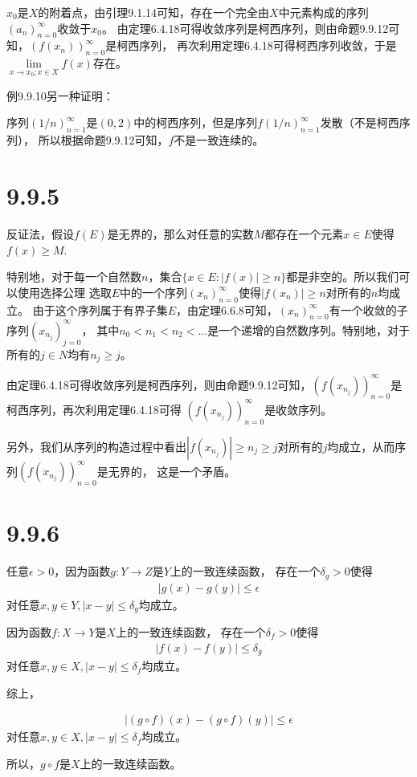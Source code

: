 \documentclass{article}
\begin{document}
$x_0$是$X$的附着点，由引理9.1.14可知，存在一个完全由$X$中元素构成的序列$(a_n)_{n=0}^\infty$收敛于$x_0$。
由定理6.4.18可得收敛序列是柯西序列，则由命题9.9.12可知，$(f(x_n))_{n=0}^\infty$是柯西序列，
再次利用定理6.4.18可得柯西序列收敛，于是
$\lim\limits_{x \to x_0; x \in X} f(x)$存在。

例9.9.10另一种证明：

序列$(1/n)_{n=1}^\infty$是$(0,2)$中的柯西序列，但是序列$f(1/n)_{n=1}^\infty$发散（不是柯西序列），
所以根据命题9.9.12可知，$f$不是一致连续的。

\section*{9.9.5}

反证法，假设$f(E)$是无界的，那么对任意的实数$M$都存在一个元素$x \in E$使得$f(x) \geq M$.

特别地，对于每一个自然数$n$，集合$\{x \in E: |f(x)| \geq n\}$都是非空的。所以我们可以使用选择公理
选取$E$中的一个序列$(x_n)_{n=0}^\infty$使得$|f(x_n)| \geq n$对所有的$n$均成立。
由于这个序列属于有界子集$E$，由定理6.6.8可知，$(x_n)_{n=0}^\infty$有一个收敛的子序列$(x_{n_j})_{j=0}^\infty$，
其中$n_0 < n_1 < n_2 < ...$是一个递增的自然数序列。特别地，对于所有的$j \in N$均有$n_j \geq j$。

由定理6.4.18可得收敛序列是柯西序列，则由命题9.9.12可知，$(f(x_{n_j}))_{n=0}^\infty$是柯西序列，再次利用定理6.4.18可得
$(f(x_{n_j}))_{n=0}^\infty$是收敛序列。

另外，我们从序列的构造过程中看出$|f(x_{n_j})| \geq n_j \geq j$对所有的$j$均成立，从而序列$(f(x_{n_j}))_{n=0}^\infty$是无界的，
这是一个矛盾。


\section*{9.9.6}

任意$\epsilon > 0$，因为函数$g: Y \to Z$是$Y$上的一致连续函数，
存在一个$\delta_g > 0$使得
\begin{align*}
  |g(x) - g(y)| \leq \epsilon 
\end{align*}
对任意$x, y \in Y, |x - y| \leq \delta_g$均成立。

因为函数$f: X \to Y$是$X$上的一致连续函数，
存在一个$\delta_f > 0$使得
\begin{align*}
  |f(x) - f(y)| \leq \delta_g
\end{align*}
对任意$x, y \in X, |x - y| \leq \delta_f$均成立。

综上，

\begin{align*}
  |(g \circ f)(x) - (g \circ f)(y)| \leq \epsilon
\end{align*}
对任意$x, y \in X, |x - y| \leq \delta_f$均成立。

所以，$g \circ f$是$X$上的一致连续函数。
\end{document}
